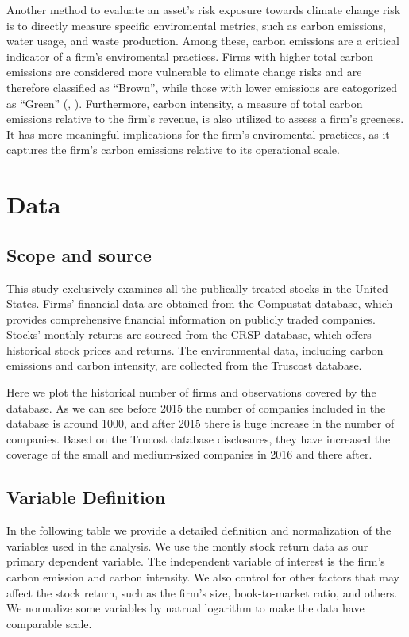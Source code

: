 \documentclass[12pt]{article}
\begin{document}
Another method to evaluate an asset's risk exposure towards climate change risk is to directly measure specific enviromental metrics, such as carbon emissions, water usage, and waste production. Among these, carbon emissions are a critical indicator of a firm's enviromental practices. Firms with higher total carbon emissions are considered more vulnerable to climate change risks and are therefore classified as ``Brown'', while those with lower emissions are catogorized as ``Green'' (\cite{bolton2021investors}, \cite{aswani2023carbon}). Furthermore, carbon intensity, a measure of total carbon emissions relative to the firm's revenue, is also utilized to assess a firm's greeness. It has more meaningful implications for the firm's enviromental practices, as it captures the firm's carbon emissions relative to its operational scale.

\section{Data}
\subsection{Scope and source}
This study exclusively examines all the publically treated stocks in the United States. Firms' financial data are obtained from the Compustat database, which provides comprehensive financial information on publicly traded companies. Stocks' monthly returns are sourced from the CRSP database, which offers historical stock prices and returns. The environmental data, including carbon emissions and carbon intensity, are collected from the Truscost database. 

Here we plot the historical number of firms and observations covered by the database. As we can see before 2015 the number of companies included in the database is around 1000, and after 2015 there is huge increase in the number of companies. Based on the Trucost database disclosures, they have increased the coverage of the small and medium-sized companies in 2016 and there after. 

\subsection{Variable Definition}

In the following table we provide a detailed definition and normalization of the variables used in the analysis. We use the montly stock return data as our primary dependent variable. The independent variable of interest is the firm's carbon emission and carbon intensity. We also control for other factors that may affect the stock return, such as the firm's size, book-to-market ratio, and others. We normalize some variables by natrual logarithm to make the data have comparable scale.
\end{document}
